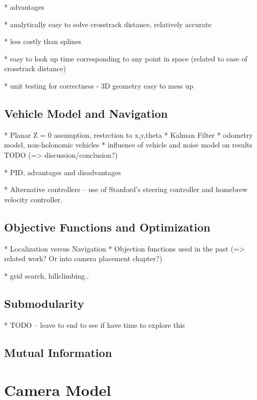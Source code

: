 \documentclass[a4paper,12pt,twoside,openright]{report}
\begin{document}
* advantages

  * analytically easy to solve crosstrack distance, relatively accurate

  * less costly than splines

  * easy to look up time corresponding to any point in space (related to ease of crosstrack distance)

* unit testing for correctness - 3D geometry easy to mess up

\section{Vehicle Model and Navigation}

* Planar Z = 0 assumption, restrction to x,y,theta
* Kalman Filter
* odometry model, non-holonomic vehicles
* influence of vehicle and noise model on results TODO (=> discussion/conclusion?)

* PID, advantages and disadvantages

* Alternative controllers -- use of Stanford's steering controller and homebrew velocity controller.

\section{Objective Functions and Optimization}

* Localization versus Navigation
* Objection functions used in the past (=> related work? Or into camera placement chapter?) 

* grid search, hillclimbing..

\section{Submodularity}
* TODO -- leave to end to see if have time to explore this

\section{Mutual Information}


 












\chapter{Camera Model}
\label{chap:cameramodel}
\end{document}
